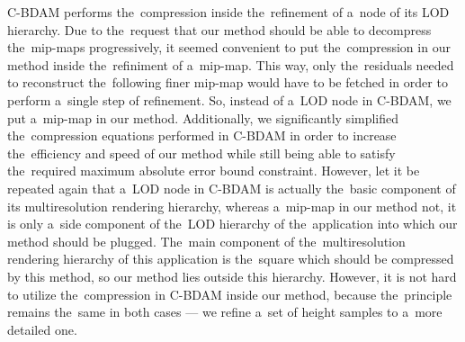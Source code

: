  C-BDAM performs the~compression inside the~refinement of a~node of its LOD hierarchy. Due to the~request that our method should be able to decompress the~mip-maps progressively, it seemed convenient to put the~compression in our method inside the~refiniment of a~mip-map. This way, only the~residuals needed to reconstruct the~following finer mip-map would have to be fetched in order to perform a~single step of refinement. So, instead of a~LOD node in C-BDAM, we put a~mip-map in our method.  Additionally, we significantly simplified the~compression equations performed in C-BDAM in order to increase the~efficiency and speed of our method while still being able to satisfy the~required maximum absolute error bound constraint. However, let it be repeated again that a~LOD node in C-BDAM is actually the~basic component of its multiresolution rendering hierarchy, whereas a~mip-map in our method not, it is only a~side component of the~LOD hierarchy of the~application into which our method should be plugged. The~main component of the~multiresolution rendering hierarchy of this application is the~square which should be compressed by this method, so our method lies outside this hierarchy. However, it is not hard to utilize the~compression in C-BDAM inside our method, because the~principle remains the~same in both cases --- we refine a~set of height samples to a~more detailed one.
